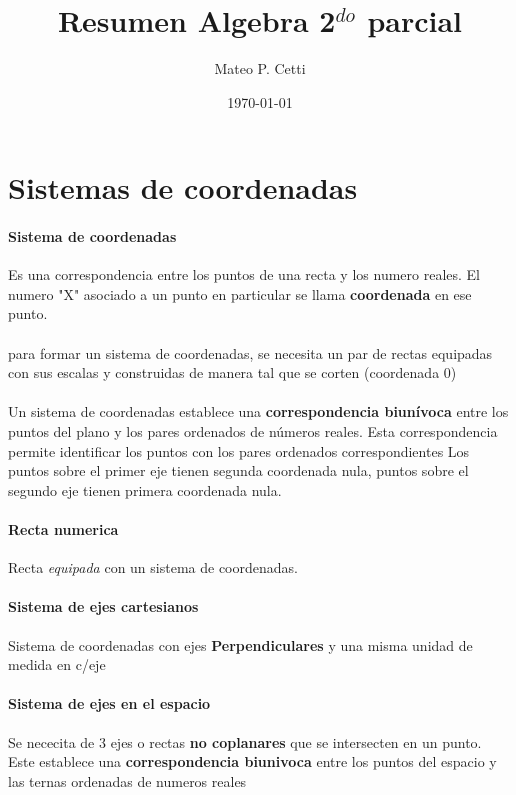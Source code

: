 \documentclass[11pt]{article}
\title{ Resumen Algebra 2$^{do}$ parcial}
\author{ Mateo P. Cetti }
\date{\today}
\begin{document}
\maketitle	
\pagebreak



\section{Sistemas de coordenadas}

\paragraph{Sistema de coordenadas}
Es una correspondencia entre los puntos de una recta y los numero reales. El numero "X" asociado a un punto en particular se llama \textbf{coordenada} en ese punto.

\paragraph{}
para formar un sistema de coordenadas, se necesita un par de rectas equipadas con sus escalas y construidas de manera tal que se corten (coordenada 0)

\paragraph*{}
Un sistema de coordenadas establece una \textbf{correspondencia biunívoca} entre los puntos del plano y los pares ordenados de números reales. Esta correspondencia permite identificar los puntos con los pares ordenados correspondientes
Los puntos sobre el primer eje tienen segunda coordenada nula, puntos sobre el segundo eje tienen primera coordenada nula.

\paragraph{Recta numerica}
Recta \emph{equipada} con un sistema de coordenadas.

\paragraph{Sistema de ejes cartesianos}
Sistema de coordenadas con ejes \textbf{Perpendiculares} y una misma unidad de medida en c/eje

\paragraph{Sistema de ejes en el espacio}
Se nececita de 3 ejes o rectas \textbf{no coplanares} que se intersecten en un punto. Este establece una \textbf{correspondencia biunivoca} entre los puntos del espacio y las ternas ordenadas de numeros reales
\end{document}
